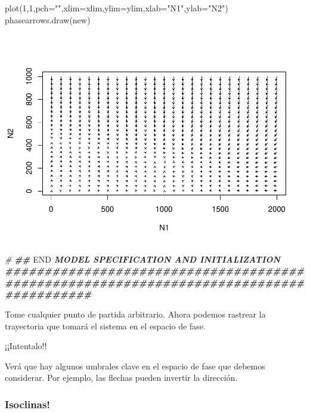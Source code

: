 \documentclass[
]{article}
\newenvironment{Shaded}{\begin{snugshade}}{\end{snugshade}}
\newcommand{\AttributeTok}[1]{\textcolor[rgb]{0.77,0.63,0.00}{#1}}
\newcommand{\CommentTok}[1]{\textcolor[rgb]{0.56,0.35,0.01}{\textit{#1}}}
\newcommand{\DecValTok}[1]{\textcolor[rgb]{0.00,0.00,0.81}{#1}}
\newcommand{\DocumentationTok}[1]{\textcolor[rgb]{0.56,0.35,0.01}{\textbf{\textit{#1}}}}
\newcommand{\FunctionTok}[1]{\textcolor[rgb]{0.00,0.00,0.00}{#1}}
\newcommand{\NormalTok}[1]{#1}
\newcommand{\RegionMarkerTok}[1]{#1}
\newcommand{\StringTok}[1]{\textcolor[rgb]{0.31,0.60,0.02}{#1}}
\begin{document}
\begin{Shaded}
\begin{Highlighting}[]
\FunctionTok{plot}\NormalTok{(}\DecValTok{1}\NormalTok{,}\DecValTok{1}\NormalTok{,}\AttributeTok{pch=}\StringTok{""}\NormalTok{,}\AttributeTok{xlim=}\NormalTok{xlim,}\AttributeTok{ylim=}\NormalTok{ylim,}\AttributeTok{xlab=}\StringTok{"N1"}\NormalTok{,}\AttributeTok{ylab=}\StringTok{"N2"}\NormalTok{)}
\FunctionTok{phasearrows.draw}\NormalTok{(new)}
\end{Highlighting}
\end{Shaded}

\includegraphics{LECTURE16_files/figure-latex/unnamed-chunk-11-1.pdf}

\begin{Shaded}
\begin{Highlighting}[]
\CommentTok{\#}
\DocumentationTok{\#\# }\RegionMarkerTok{END}\DocumentationTok{ MODEL SPECIFICATION AND INITIALIZATION}
\DocumentationTok{\#\#\#\#\#\#\#\#\#\#\#\#\#\#\#\#\#\#\#\#\#\#\#\#\#\#\#\#\#\#\#\#\#\#\#\#\#\#\#\#\#\#\#\#\#\#\#\#\#\#\#\#\#\#\#\#\#\#\#\#\#\#\#\#\#\#\#\#\#\#\#\#\#\#\#\#\#\#\#\#\#\#\#\#\#\#\#}
\end{Highlighting}
\end{Shaded}

Tome cualquier punto de partida arbitrario. Ahora podemos rastrear la
trayectoria que tomará el sistema en el espacio de fase.

¡¡Intentalo!!

Verá que hay algunos umbrales clave en el espacio de fase que debemos
considerar. Por ejemplo, las flechas pueden invertir la dirección.

\hypertarget{isoclinas}{%
\subsubsection{Isoclinas!}\label{isoclinas}}
\end{document}
